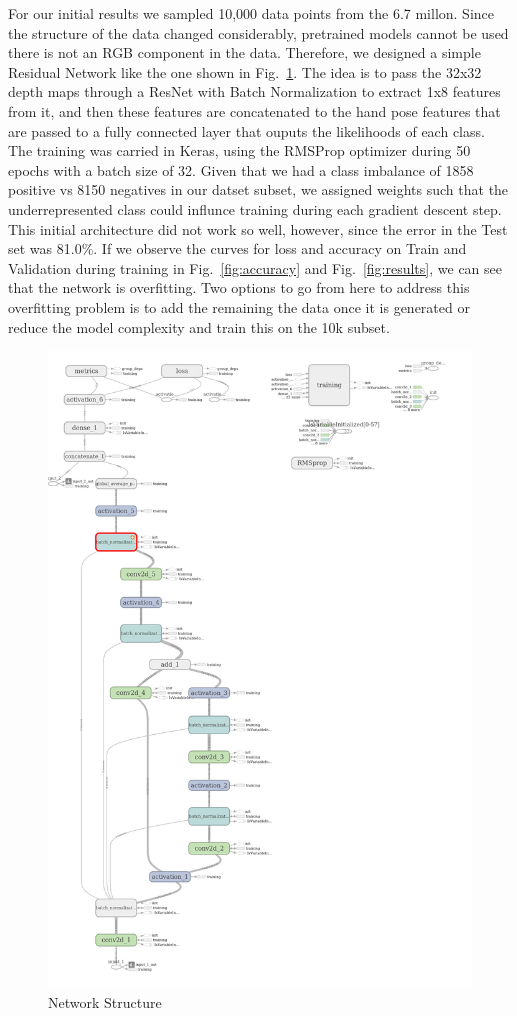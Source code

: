 \documentclass[letterpaper, 10 pt]{article}
\newcommand{\figref}[1]{Fig.~\ref{#1}} %
\begin{document}
For our initial results we sampled 10,000 data points from the 6.7 millon. Since the structure of the data changed considerably, pretrained models cannot be used there is not an RGB component in the data. Therefore, we designed a simple Residual Network
like the one shown in \figref{fig:network}. The idea is to pass the 32x32 depth maps through a ResNet with Batch Normalization to extract 1x8 features from it, and then these features are concatenated to the hand pose features that are passed to a fully connected layer that ouputs
the likelihoods of each class. The training was carried in Keras, using the RMSProp optimizer during 50 epochs with a batch size of 32. Given that we had a class imbalance of 1858 positive vs 8150 negatives in our datset subset, we assigned weights such that the underrepresented class
could influnce training during each gradient descent step. This initial architecture did not work so well, however, since the error in the Test set was 81.0\%. If we observe the curves for loss and accuracy on Train and Validation during training in \figref{fig:accuracy} and \figref{fig:results},
we can see that the network is overfitting. Two options to go from here to address this overfitting problem is to add the remaining the data once it is generated or reduce the model complexity and train this on the 10k subset. 

\begin{figure}[t!]
    \centering
        \includegraphics[width=0.5\columnwidth]{figs/dex_resnet.png}
    \caption{Network Structure} \label{fig:network}
\end{figure}
\end{document}
